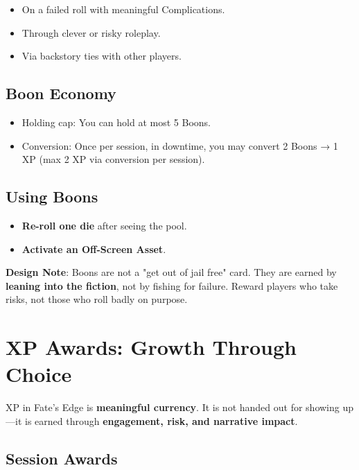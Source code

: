 \begin{itemize}
    \item On a failed roll with meaningful Complications.
    \item Through clever or risky roleplay.
    \item Via backstory ties with other players.
\end{itemize}

\subsection*{Boon Economy}

\begin{itemize}
    \item Holding cap: You can hold at most 5 Boons.
    \item Conversion: Once per session, in downtime, you may convert 2 Boons → 1 XP (max 2 XP via conversion per session).
\end{itemize}

\subsection*{Using Boons}

\begin{itemize}
    \item \textbf{Re-roll one die} after seeing the pool.
    \item \textbf{Activate an Off-Screen Asset}.
\end{itemize}

\textbf{Design Note}: Boons are not a "get out of jail free" card. They are earned by \textbf{leaning into the fiction}, not by fishing for failure. Reward players who take risks, not those who roll badly on purpose.

\section*{XP Awards: Growth Through Choice}

XP in Fate's Edge is \textbf{meaningful currency}. It is not handed out for showing up---it is earned through \textbf{engagement, risk, and narrative impact}.

\subsection*{Session Awards}

